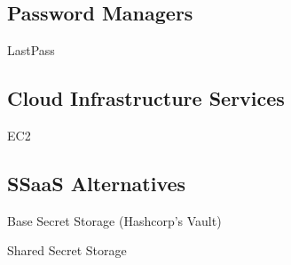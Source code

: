 \subsection{Password Managers}

LastPass

\subsection{Cloud Infrastructure Services}

EC2

\subsection{SSaaS Alternatives}

Base Secret Storage (Hashcorp's Vault)

Shared Secret Storage

